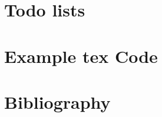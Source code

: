 \documentclass[12pt,a4paper,oneside,bibliography=totoc]{scrbook}
\begin{document}
\chapter{Todo lists}\label{ch:lm-transformers}


\chapter{Example tex Code}\label{ch:lit-review}


\chapter{Bibliography}




\appendix

\end{document}
